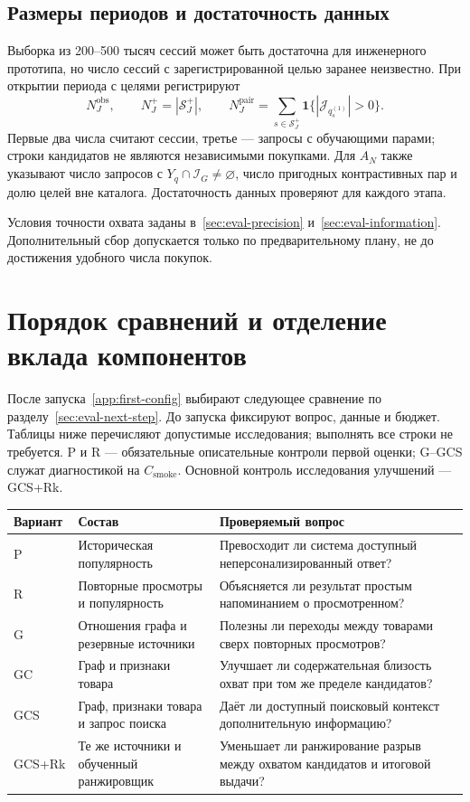 \documentclass[12pt,a4paper]{article}
\newcommand{\ind}{\mathbf 1}
\theoremstyle{plainru}
\begin{document}
\subsection{Размеры периодов и достаточность данных}

Выборка из 200--500 тысяч сессий может быть достаточна для инженерного
прототипа, но число сессий с зарегистрированной целью заранее неизвестно.
При открытии периода с целями регистрируют
\begin{equation}\label{eq:app-positive-counts}
N_J^{\mathrm{obs}},\qquad N_J^+=|\mathcal S_J^+|,\qquad
N_J^{\mathrm{pair}}=\sum_{s\in\mathcal S_J^+}\ind\{|\mathcal J_{q_s^{(1)}}|>0\}.
\end{equation}
Первые два числа считают сессии, третье --- запросы с обучающими
парами; строки кандидатов не являются независимыми покупками.
Для $A_N$ также указывают число запросов с $Y_q\cap\mathcal I_G\ne\varnothing$,
число пригодных контрастивных пар и долю целей вне каталога.
Достаточность данных проверяют для каждого этапа.

Условия точности охвата заданы
в~\ref{sec:eval-precision} и~\ref{sec:eval-information}.
Дополнительный сбор допускается только по предварительному плану,
не до достижения удобного числа покупок.

\clearpage
\section{Порядок сравнений и отделение вклада компонентов}\label{app:ablation}

После запуска~\ref{app:first-config} выбирают следующее сравнение
по разделу~\ref{sec:eval-next-step}. До запуска фиксируют вопрос,
данные и бюджет. Таблицы ниже перечисляют допустимые исследования;
выполнять все строки не требуется. P и R --- обязательные описательные
контроли первой оценки; G--GCS служат диагностикой на $C_{\mathrm{smoke}}$.
Основной контроль исследования улучшений --- GCS+Rk.

\begin{longtable}{L{0.12\textwidth}L{0.40\textwidth}L{0.38\textwidth}}
\toprule Вариант & Состав & Проверяемый вопрос \\\midrule\endhead
P & Историческая популярность & Превосходит ли система доступный
неперсонализированный ответ? \\
R & Повторные просмотры и популярность & Объясняется ли результат
простым напоминанием о просмотренном? \\
G & Отношения графа и резервные источники & Полезны ли переходы между
товарами сверх повторных просмотров? \\
GC & Граф и признаки товара & Улучшает ли содержательная близость охват при
том же пределе кандидатов? \\
GCS & Граф, признаки товара и запрос поиска & Даёт ли доступный поисковый
контекст дополнительную информацию? \\
GCS+Rk & Те же источники и обученный ранжировщик & Уменьшает ли
ранжирование разрыв между охватом кандидатов и итоговой выдачи? \\
\bottomrule
\end{longtable}
\end{document}
